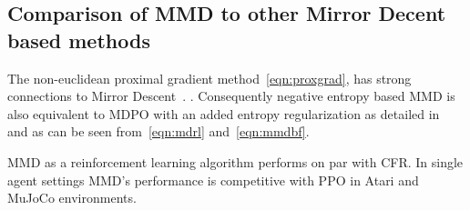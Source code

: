\subsection{Comparison of MMD to other Mirror Decent based methods}

The non-euclidean proximal gradient method~\ref{eqn:proxgrad}, has strong connections to Mirror Descent~\cite[Appendix D.3]{sokotaUnified2023}.
.
Consequently negative entropy based MMD is also equivalent to MDPO with an added entropy regularization 
as detailed in~\cite[Appendix L]{sokotaUnified2023} and as can be seen from~\ref{eqn:mdrl} and~\ref{eqn:mmdbf}.


MMD as a reinforcement learning algorithm performs on par with CFR.
In single agent settings MMD's performance is competitive with PPO in Atari and MuJoCo
environments.